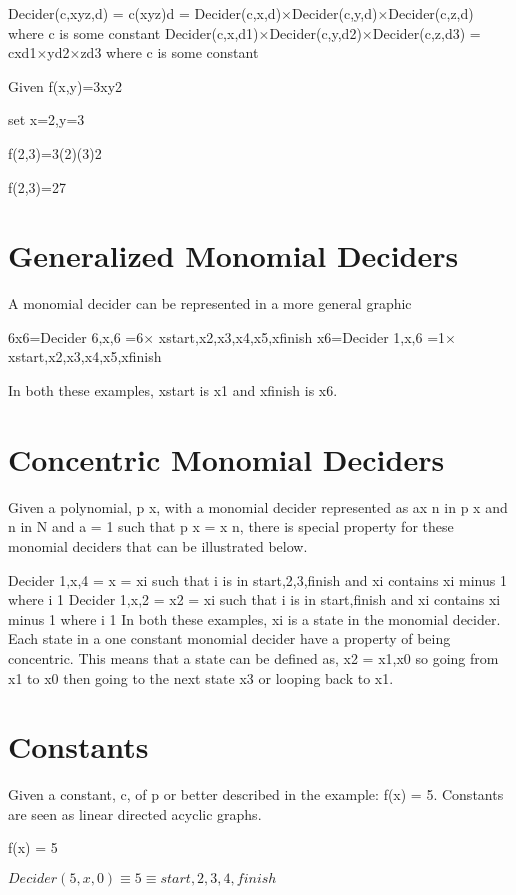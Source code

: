 Decider(c,xyz,d) = c(xyz)d = Decider(c,x,d)$\times $Decider(c,y,d)$\times $Decider(c,z,d) where c is some constant
Decider(c,x,d1)$\times $Decider(c,y,d2)$\times $Decider(c,z,d3) = cxd1$\times $yd2$\times $zd3 where c is some constant

Given f(x,y)=3xy2

set x=2,y=3

f(2,3)=3(2)(3)2

f(2,3)=27

\section{Generalized Monomial Deciders}

A monomial decider can be represented in a more general graphic

6x6=Decider 6,x,6 =6$\times $ xstart,x2,x3,x4,x5,xfinish 
 x6=Decider 1,x,6 =1$\times $ xstart,x2,x3,x4,x5,xfinish 


In both these examples, xstart is x1 and xfinish is x6.


\section{Concentric Monomial Deciders}

Given a polynomial, p x, with a monomial decider represented as ax n in p x and n in N and a = 1 such that p x = x n, there is special property for these monomial deciders that can be illustrated below.

Decider 1,x,4 = x = xi such that i is in start,2,3,finish and xi contains xi minus 1 where i 1
 Decider 1,x,2 = x2 = xi such that i is in start,finish and xi contains xi minus 1 where i 1
 In both these examples, xi is a state in the monomial decider.
Each state in a one constant monomial decider have a property of being concentric. This means that a state can be defined as, x2 =
 x1,x0 so going from x1 to x0 then going to the next state x3 or looping back to x1.
 
\section{Constants}

Given a constant, c, of p or better described in the example: f(x) = 5. Constants are seen as linear directed acyclic graphs.

f(x) = 5

$Decider(5,x,0) \equiv 5 \equiv {start,2,3,4,finish}$

